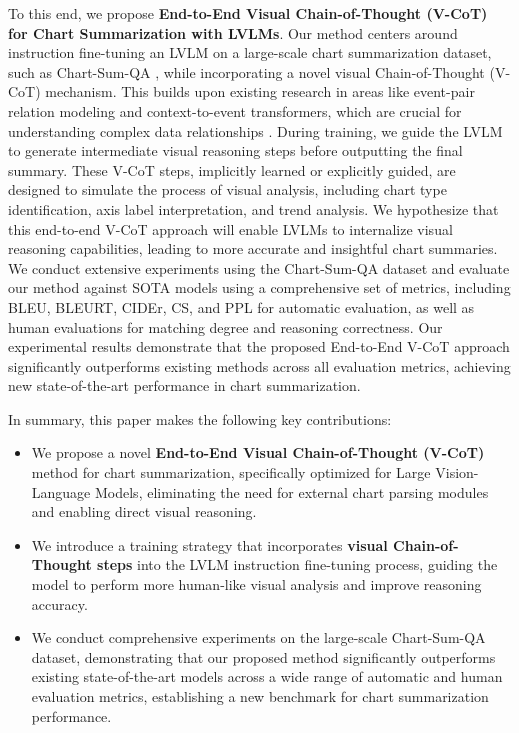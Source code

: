 To this end, we propose \textbf{End-to-End Visual Chain-of-Thought (V-CoT) for Chart Summarization with LVLMs}. Our method centers around instruction fine-tuning an LVLM on a large-scale chart summarization dataset, such as Chart-Sum-QA \cite{ChartThinker2024}, while incorporating a novel visual Chain-of-Thought (V-CoT) mechanism.  This builds upon existing research in areas like event-pair relation modeling and context-to-event transformers, which are crucial for understanding complex data relationships \cite{zhou2021modeling,zhou2022claret}.  During training, we guide the LVLM to generate intermediate visual reasoning steps before outputting the final summary. These V-CoT steps, implicitly learned or explicitly guided, are designed to simulate the process of visual analysis, including chart type identification, axis label interpretation, and trend analysis. We hypothesize that this end-to-end V-CoT approach will enable LVLMs to internalize visual reasoning capabilities, leading to more accurate and insightful chart summaries. We conduct extensive experiments using the Chart-Sum-QA dataset and evaluate our method against SOTA models using a comprehensive set of metrics, including BLEU, BLEURT, CIDEr, CS, and PPL for automatic evaluation, as well as human evaluations for matching degree and reasoning correctness. Our experimental results demonstrate that the proposed End-to-End V-CoT approach significantly outperforms existing methods across all evaluation metrics, achieving new state-of-the-art performance in chart summarization.

In summary, this paper makes the following key contributions:
\begin{itemize}
\item We propose a novel \textbf{End-to-End Visual Chain-of-Thought (V-CoT)} method for chart summarization, specifically optimized for Large Vision-Language Models, eliminating the need for external chart parsing modules and enabling direct visual reasoning.
\item We introduce a training strategy that incorporates \textbf{visual Chain-of-Thought steps} into the LVLM instruction fine-tuning process, guiding the model to perform more human-like visual analysis and improve reasoning accuracy.
\item We conduct comprehensive experiments on the large-scale Chart-Sum-QA dataset, demonstrating that our proposed method significantly outperforms existing state-of-the-art models across a wide range of automatic and human evaluation metrics, establishing a new benchmark for chart summarization performance.
\end{itemize}

